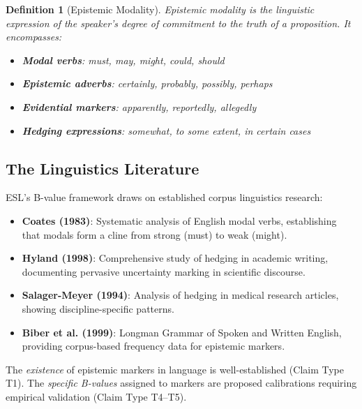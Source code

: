 \documentclass[11pt,a4paper]{article}
\newtheorem{definition}{Definition}[section]
\theoremstyle{remark}
\begin{document}
\begin{definition}[Epistemic Modality]
\label{def:epistemic}
Epistemic modality is the linguistic expression of the speaker's degree of commitment to the truth of a proposition. It encompasses:
\begin{itemize}
    \item \textbf{Modal verbs}: must, may, might, could, should
    \item \textbf{Epistemic adverbs}: certainly, probably, possibly, perhaps
    \item \textbf{Evidential markers}: apparently, reportedly, allegedly
    \item \textbf{Hedging expressions}: somewhat, to some extent, in certain cases
\end{itemize}
\end{definition}

\subsection{The Linguistics Literature}

ESL's B-value framework draws on established corpus linguistics research:

\begin{itemize}
    \item \textbf{Coates (1983)}: Systematic analysis of English modal verbs, establishing that modals form a cline from strong (must) to weak (might).

    \item \textbf{Hyland (1998)}: Comprehensive study of hedging in academic writing, documenting pervasive uncertainty marking in scientific discourse.

    \item \textbf{Salager-Meyer (1994)}: Analysis of hedging in medical research articles, showing discipline-specific patterns.

    \item \textbf{Biber et al. (1999)}: Longman Grammar of Spoken and Written English, providing corpus-based frequency data for epistemic markers.
\end{itemize}

\begin{keyinsight}[title={The Linguistic Foundation}]
The \textit{existence} of epistemic markers in language is well-established (Claim Type T1). The \textit{specific B-values} assigned to markers are proposed calibrations requiring empirical validation (Claim Type T4--T5).
\end{keyinsight}
\end{document}
